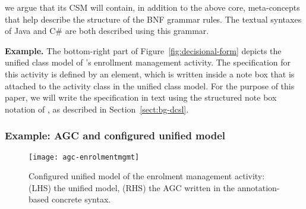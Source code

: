 {%
we argue that its CSM will contain, in addition to the above core, meta-concepts that help describe the structure of the BNF grammar rules. The textual syntaxes of Java and C\# are both described using this grammar.

\noindent \textbf{Example.} 
The bottom-right part of Figure~\ref{fig:decisional-form} depicts the unified class model of \courseman's enrollment management activity. The \agl specification for this activity is defined by an  element, which is written inside a note box that is attached to the  activity class in the unified class model. For the purpose of this paper, we will write the \agl specification in text using the structured note box notation of \dcsl, as described in Section~\ref{sect:bg-dcsl}.

\subsubsection*{Example: AGC and configured unified model}
\begin{figure}[ht]
	\begin{center}
		\texttt{[image: agc-enrolmentmgmt]}
	\end{center}
	\caption{Configured unified model of the enrolment management activity: (LHS) the unified model, (RHS) the AGC written in the annotation-based concrete syntax.} %
	\label{fig:agc-enrolmentmgmt}
\end{figure}

}
